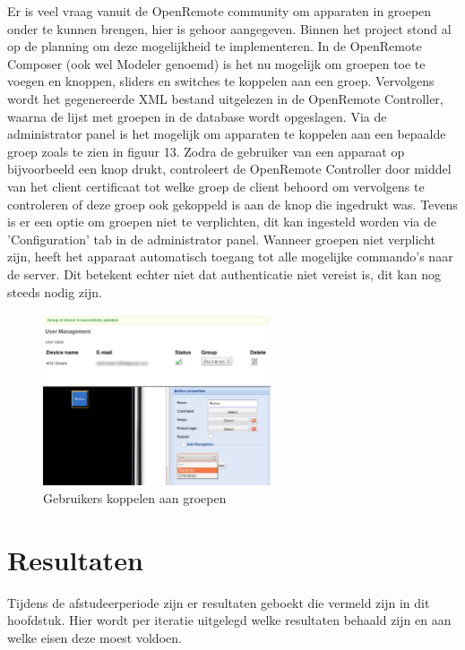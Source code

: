 \documentclass[]{article}
\begin{document}
Er is veel vraag vanuit de OpenRemote community om apparaten in groepen onder te
kunnen brengen, hier is gehoor aangegeven. Binnen het project stond al op de
planning om deze mogelijkheid te implementeren. In de OpenRemote Composer (ook
wel Modeler genoemd) is het nu mogelijk om groepen toe te voegen en knoppen,
sliders en switches te koppelen aan een groep. Vervolgens wordt het gegenereerde
XML bestand uitgelezen in de OpenRemote Controller, waarna de lijst met groepen
in de database wordt opgeslagen. Via de administrator panel is het mogelijk om
apparaten te koppelen aan een bepaalde groep zoals te zien in figuur 13. Zodra
de gebruiker van een apparaat op bijvoorbeeld een knop drukt, controleert de
OpenRemote Controller door middel van het client certificaat tot welke groep de
client behoord om vervolgens te controleren of deze groep ook gekoppeld is aan
de knop die ingedrukt was. Tevens is er een optie om groepen niet te
verplichten, dit kan ingesteld worden via de 'Configuration' tab in de
administrator panel. Wanneer groepen niet verplicht zijn, heeft het apparaat
automatisch toegang tot alle mogelijke commando's naar de server. Dit betekent
echter niet dat authenticatie niet vereist is, dit kan nog steeds nodig zijn.

\begin{figure}[htpb]
   \begin{center}
     \includegraphics[width=0.6\textwidth]{usergroups.pdf}
   \end{center}
   \caption{Gebruikers koppelen aan groepen}
\end{figure}

\newpage
\section{Resultaten}

Tijdens de afstudeerperiode zijn er resultaten geboekt die vermeld zijn in dit
hoofdstuk. Hier wordt per iteratie uitgelegd welke resultaten behaald
zijn en aan welke eisen deze moest voldoen.
\end{document}
